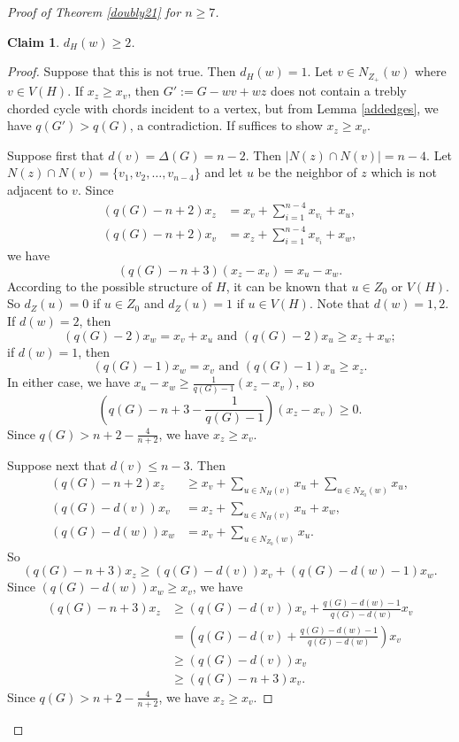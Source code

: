 \documentclass[12pt]{article}
\newtheorem {claim}{Claim}[section]
\begin{document}
\begin{proof}[Proof of Theorem \ref{doubly21} for $n\ge 7$]
\begin{claim}\label{211}
$d_{H}(w)\ge 2$.
\end{claim}
\begin{proof}
Suppose that this is not true. Then $d_{H}(w)=1$. Let $v\in N_{Z_+}(w)$ where $v\in V(H)$.
If  $x_z\ge x_v$, then $G':=G-wv+wz$ does not contain a trebly chorded cycle with chords incident to a vertex, but from Lemma \ref{addedges}, we have $q(G')>q(G)$, a contradiction. If suffices to show $x_z\ge x_v$.

Suppose first that $d(v)=\Delta(G)=n-2$. Then $|N(z)\cap N(v)|=n-4$.
Let $N(z)\cap N(v)=\{v_1,v_2,\ldots,v_{n-4}\}$ and let $u$ be the neighbor of $z$ which is not adjacent to $v$.
Since
\begin{align*}
\left(q(G)-n+2\right)x_z&=x_v+\sum_{i=1}^{n-4}x_{v_i}+x_u,\\
\left(q(G)-n+2\right)x_v&=x_z+\sum_{i=1}^{n-4}x_{v_i}+x_w,
\end{align*}
we have
\[
\left(q(G)-n+3\right)\left(x_z-x_v\right)=x_u-x_w.
\]
According to the possible structure of $H$, it can be known that $u\in Z_0$ or $V(H)$.
So $d_Z(u)=0$ if $u\in Z_0$ and $d_Z(u)=1$ if $u\in V(H)$.
Note that $d(w)=1,2$.
If $d(w)=2$, then
\[
\left(q(G)-2\right)x_w=x_v+x_u \textrm{ and } \left(q(G)-2\right)x_u\ge x_z+x_w;
\]
if $d(w)=1$, then
\[
\left(q(G)-1\right)x_w= x_v \textrm{ and } \left(q(G)-1\right)x_u\ge x_z.
\]
In either case, we have  $x_u-x_w\ge \frac{1}{q(G)-1}\left(x_z-x_v\right)$, so
\[
\left(q(G)-n+3-\frac{1}{q(G)-1}\right)\left(x_z-x_v\right)\ge 0.
\]
Since $q(G)>n+2-\frac{4}{n+2}$, we have $x_z\ge x_v$.

Suppose next that $d(v)\le n-3$. Then
\begin{align*}
\left(q(G)-n+2\right)x_z&\ge x_v+\sum_{u\in N_{H}(v)}x_u+\sum_{u\in N_{Z_0}(w)}x_u,\\
\left(q(G)-d(v)\right)x_v&=x_z+\sum_{u\in N_{H}(v)}x_u+x_w,\\
\left(q(G)-d(w)\right)x_w&=x_v+\sum_{u\in N_{Z_0}(w)}x_u.
\end{align*}
So
\[
\left(q(G)-n+3\right)x_z\ge \left(q(G)-d(v)\right)x_v+\left(q(G)-d(w)-1\right)x_w.
\]
Since $\left(q(G)-d(w)\right)x_w\ge x_v$,  we have
\begin{align*}
\left(q(G)-n+3\right)x_z&\ge \left(q(G)-d(v)\right)x_v+\frac{q(G)-d(w)-1}{q(G)-d(w)}x_v\\
&=\left(q(G)-d(v)+\frac{q(G)-d(w)-1}{q(G)-d(w)}\right)x_v\\
&\ge \left(q(G)-d(v)\right)x_v\\
&\ge \left(q(G)-n+3\right)x_v.
\end{align*}
Since $q(G)>n+2-\frac{4}{n+2}$, we have $x_z\ge x_v$.
\end{proof}


\end{proof}
\end{document}
